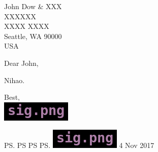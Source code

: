 \documentclass[letterpaper]{letter}
\date{4 November 2017}
\begin{document}
\begin{letter}{John Dow \& XXX \\ XXXXXX \\ XXXX
    XXXX \\ Seattle, WA 90000 \\ USA}
\opening{Dear John,}
Nihao.
\closing{Best, \\
    \includegraphics[height=1.5\baselineskip]{sig}}

\ps
    \vspace{10pt}
    PS PS PS.
\includegraphics[height=1.5\baselineskip]{sig}
    \hspace{100pt}4 Nov 2017

\end{letter}
\end{document}
